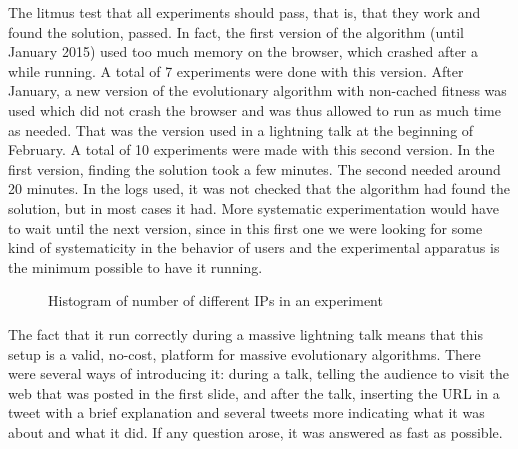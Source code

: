 \documentclass{sig-alternate}
\begin{document}
The litmus test that all experiments should pass, that is, that they
work and found the solution, passed. In fact, the first version of the
algorithm (until January 2015) used too much memory on the browser,
which crashed after a while running. A total of 7 experiments were
done with this version. After January, a new version of the
evolutionary algorithm with non-cached fitness was used which did not
crash the browser and was thus allowed to run as much time as
needed. That was the version used in a lightning talk at the beginning
of February. A total of 10 experiments were made with this second
version. In the first version, finding the solution took a few
minutes. The second needed around 20 minutes. In the logs used, it was
not checked that the algorithm had found the solution, but in most
cases it had. More systematic experimentation would have to wait until
the next version, since in this first one we were looking for some
kind of systematicity in the behavior of users and the experimental
apparatus is the minimum possible to have it running.
%
\begin{figure}[htb]
        \centering
        \caption{Histogram of number of different IPs in an experiment}\label{fig:histo:ips}
\end{figure}

The fact that it run correctly during a massive lightning talk means that this setup is a
valid, no-cost, platform for massive evolutionary algorithms. There
were several ways of introducing it: during a talk, telling the
audience to visit the web that was posted in the first slide, and
after the talk, inserting the URL in a tweet with a brief explanation
and several tweets more indicating what it was about and what it
did. If any question arose, it was answered as fast as possible. 
\end{document}
